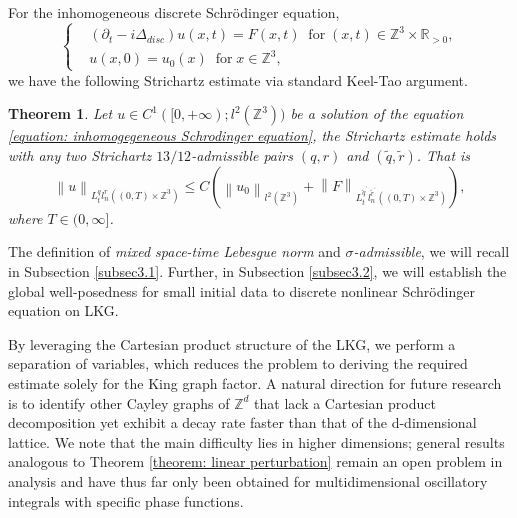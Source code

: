 \documentclass[12pt]{amsart}
\newtheorem{theorem}{Theorem}[section]
\newcommand\norm[1]{\left\|#1\right\|}
\newcommand{\R}{\mathbb{R}}
\newcommand{\Z}{\mathbb{Z}}
\begin{document}
For the inhomogeneous discrete Schr\"odinger equation, 
\begin{equation}\label{equation: inhomogegeneous Schrodinger equation}
		\begin{cases}
			&\left(\partial_{t}-i\Delta_{disc}\right)u\left(x,t\right)=F\left(x,t\right)\;\;\mathrm{for}\;\left(x,t\right)\in\Z^{3}\times\R_{>0},\\
			&u\left(x,0\right)=u_{0}\left(x\right)\;\;\mathrm{for}\;x\in\Z^{3},
		\end{cases}
	\end{equation}
we have the following Strichartz estimate via standard Keel-Tao argument.
\begin{theorem}\label{thm:Strichartz}
Let $u\in C^1([0,+\infty);l^2(\mathbb{Z}^3))$ be a solution of the equation \eqref{equation: inhomogegeneous Schrodinger equation}, the Strichartz estimate holds with any two Strichartz $13/12$-admissible pairs $\left(q,r\right)$ and $\left(\tilde{q},\tilde{r}\right)$. That is 
\begin{equation}
	\norm{u}_{L^{q}_{t}l^{r}_{n}\left(\left(0,T\right)\times\Z^{3}\right)}\leq C\left(\norm{u_{0}}_{l^{2}\left(\Z^{3}\right)}+\norm{F}_{L^{\tilde{q}^{\prime}}_{t}l^{\tilde{r}^{\prime}}_{n}\left(\left(0,T\right)\times\Z^{3}\right)}\right),
\end{equation}
where $T\in (0, \infty]$.
\end{theorem}
The definition of \textit{mixed space-time Lebesgue norm} and \textit{$\sigma$-admissible}, we will recall in Subsection \ref{subsec3.1}. Further, in Subsection \ref{subsec3.2}, we will establish the global well-posedness for small initial data to discrete nonlinear Schr\"odinger equation on LKG.


By leveraging the Cartesian product structure of the LKG, we perform a separation of variables, which reduces the problem to deriving the required estimate solely for the King graph factor. A natural direction for future research is to identify other Cayley graphs of $\mathbb{Z}^d$ that lack a Cartesian product decomposition yet exhibit a decay rate faster than that of the d-dimensional lattice. We note that the main difficulty lies in higher dimensions; general results analogous to Theorem \ref{theorem: linear perturbation} remain an open problem in analysis and have thus far only been obtained for multidimensional oscillatory integrals with specific phase functions.
\end{document}
